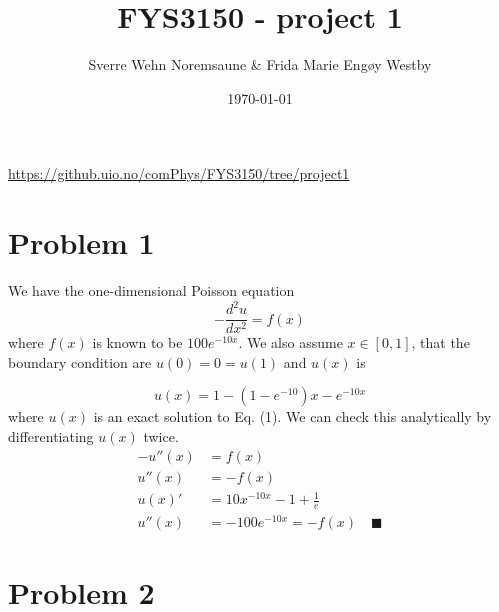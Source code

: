 \documentclass[english,notitlepage]{revtex4-1}  %
\begin{document}
\title{FYS3150 - project 1}      %
\author{Sverre Wehn Noremsaune \& Frida Marie Engøy Westby}          %
\date{\today}                             %
\noaffiliation                            %


\maketitle 
    
\url{https://github.uio.no/comPhys/FYS3150/tree/project1}
    
\section*{Problem 1}

We have the one-dimensional Poisson equation
\begin{equation}\label{eq:one-dimensional Poisson}
    - \frac{d^2u}{dx^2} = f(x)
\end{equation}
where $f(x)$ is known to be $100e^{-10x}$. We also assume $x \in [0,1]$, that the boundary condition are $u(0) = 0 = u(1)$ and $u(x)$ is

\begin{equation}\label{eq:exact solution one-dimensional Poisson}
    u(x) = 1 - (1 - e^{-10})x-e^{-10x}
\end{equation}
where $u(x)$ is an exact solution to Eq. (1). We can check this analytically by differentiating $u(x)$ twice.
\begin{equation*}
    \begin{split}
    	-u''(x) &= f(x) \\
    	u''(x) &= -f(x) \\
        u(x)' &= 10x^{-10x} - 1 + \frac{1}{e} \\
        u''(x) &= -100e^{-10x}= -f(x) \quad \blacksquare
    \end{split}
\end{equation*}


\section*{Problem 2}
\end{document}
